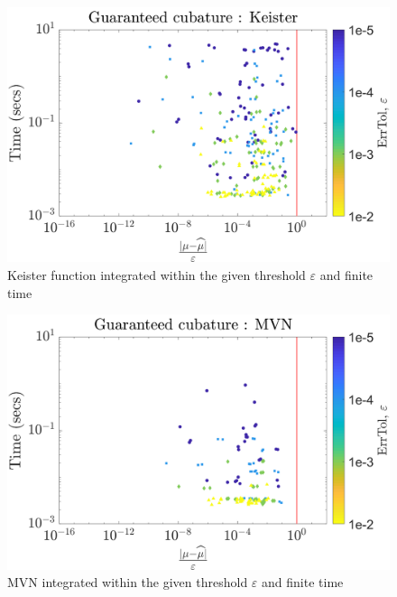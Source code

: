 \documentclass[twocolumn]{svjour3}          %
\begin{document}
\begin{figure}
	\centering
	\includegraphics[width=0.95\linewidth]{"figures/Keister guaranteed 20-Jul-2018 20-54-43"}
	\caption[Guaranteed:]{Keister function integrated within the given threshold $\varepsilon$ and finite time}
	\label{fig:keister-guaranteed}
\end{figure}



\begin{figure}
	\centering
	\includegraphics[width=0.95\linewidth]{"figures/MVN guaranteed 19-Jul-2018 00-01-41"}
	\caption[Guaranteed:]{MVN integrated within the given threshold $\varepsilon$ and finite time}
	\label{fig:MVN-guaranteed}
\end{figure}
\end{document}
